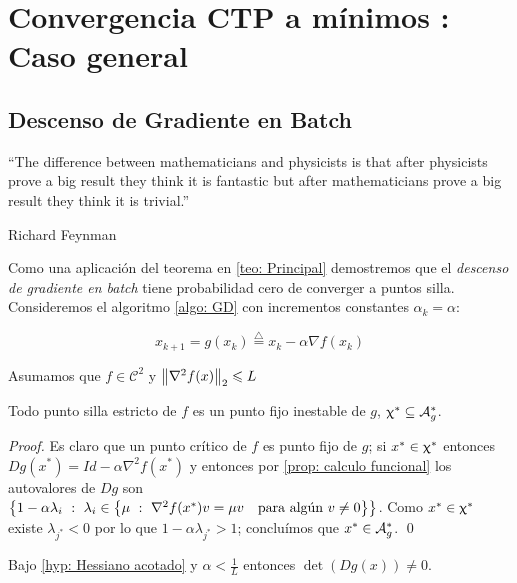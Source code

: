 \chapter{Convergencia CTP a m\'inimos : Caso general}\label{ch: aplicaciones}
\section{Descenso de Gradiente en Batch}

\epigraph{“The difference between mathematicians and physicists is that after physicists prove a big result they think it is fantastic but after mathematicians prove a big result they think it is trivial.”}{Richard Feynman}

Como una aplicaci\'on del teorema en \ref{teo: Principal} demostremos que el \textit{descenso de gradiente en batch} tiene probabilidad cero de converger a puntos silla. Consideremos el algoritmo \ref{algo: GD} con incrementos constantes $\alpha_k = \alpha$:

\begin{equation}
	\label{eq: GD}
	x_{k+1} = g(x_k) \stackrel{\triangle}{=} x_k - \alpha \nabla f(x_k)
\end{equation}

\begin{hyp}
	\label{hyp: Hessiano acotado}
	Asumamos que $f \in \mathcal{C}^2$ y $\left\lVert\nabla^2 f(x)\right\rVert_2 \leqslant L$
\end{hyp}

\begin{proposition}
	\label{prop: GD los puntos silla estrictos son fijos inestables}
	Todo punto silla estricto de $f$ es un punto fijo inestable de $g$, \ie $\upchi^* \subseteq \mathcal{A}_{g}^{*}$.
\end{proposition}

\begin{proof}
	Es claro que un punto cr\'itico de $f$ es punto fijo de $g$; si $x^* \in \upchi^*$ entonces $Dg(x^*) = Id - \alpha \nabla^2 f(x^*)$ y entonces por \ref{prop: calculo funcional} los autovalores de $Dg$ son $\left\lbrace1 - \alpha \lambda_i ~:~ \lambda_i \in \left\lbrace\mu ~:~ \nabla^2 f(x^*)v = \mu v \quad \text{para alg\'un } v \neq 0\right\rbrace\right\rbrace$. Como $x^* \in \upchi^*$ existe $\lambda_{j^*} < 0$ por lo que $1 - \alpha\lambda_{j^*} >1$; conclu\'imos que $x^{*} \in \mathcal{A}_{g}^{*}$. \qed
	
\end{proof}

\begin{proposition}
	\label{prop: GD g es difeo local}
	Bajo \ref{hyp: Hessiano acotado} y $\alpha < \frac{1}{L}$ entonces $\det \left(Dg (x)\right) \neq 0$.
\end{proposition}

